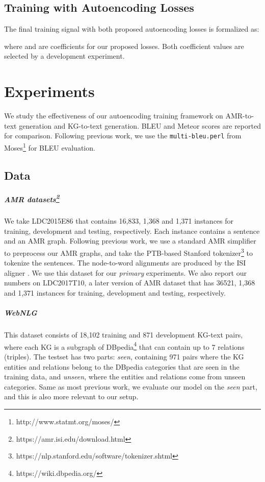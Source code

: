 \documentclass[11pt,a4paper]{article}
\begin{document}
\subsection{Training with Autoencoding Losses}


The final training signal with both proposed autoencoding losses is formalized as:

where  and  are coefficients for our proposed losses.
Both coefficient values are selected by a development experiment.


\section{Experiments}


We study the effectiveness of our autoencoding training framework on AMR-to-text generation and KG-to-text generation.
BLEU \cite{papineni2002bleu} and Meteor \cite{denkowski:lavie:meteor-wmt:2014} scores are reported for comparison. Following previous work, we use the \texttt{multi-bleu.perl} from Moses\footnote{http://www.statmt.org/moses/} for BLEU evaluation.


\subsection{Data}


\subparagraph{AMR datasets\footnote{https://amr.isi.edu/download.html}} 
We take LDC2015E86 that contains 16,833, 1,368 and 1,371 instances for training, development and testing, respectively.
Each instance contains a sentence and an AMR graph.
Following previous work, we use a standard AMR simplifier \citep{konstas2017neural} to preprocess our AMR graphs, and take the PTB-based Stanford tokenizer\footnote{https://nlp.stanford.edu/software/tokenizer.shtml} to tokenize the sentences.
The node-to-word alignments are produced by the ISI aligner \citep{pourdamghani2014aligning}.
We use this dataset for our \emph{primary} experiments.
We also report our numbers on LDC2017T10, a later version of AMR dataset that has 36521, 1,368 and 1,371 instances for training, development and testing, respectively.


\subparagraph{WebNLG \citep{gardent2017webnlg}}
This dataset consists of 18,102 training and 871 development KG-text pairs, where each KG is a subgraph of DBpedia\footnote{https://wiki.dbpedia.org/} that can contain up to 7 relations (triples).
The testset has two parts: \emph{seen}, containing 971 pairs where the KG entities and relations belong to the DBpedia categories that are seen in the training data, and \emph{unseen}, where the entities and relations come from unseen categories.
Same as most previous work, we evaluate our model on the \emph{seen} part, and this is also more relevant to our setup.
\end{document}
